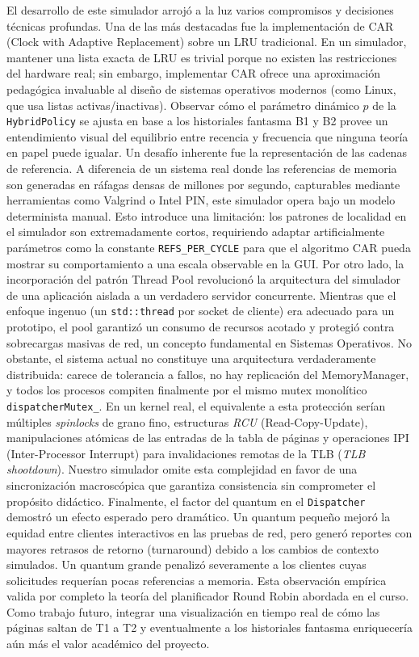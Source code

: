 \documentclass[12pt,letterpaper]{article}
\begin{document}
El desarrollo de este simulador arrojó a la luz varios compromisos y decisiones técnicas profundas.
Una de las más destacadas fue la implementación de CAR (Clock with Adaptive Replacement) sobre un LRU tradicional.
En un simulador, mantener una lista exacta de LRU es trivial porque no existen las restricciones del hardware real;
sin embargo, implementar CAR ofrece una aproximación pedagógica invaluable al diseño de sistemas operativos modernos (como Linux, que usa listas activas/inactivas).
Observar cómo el parámetro dinámico $p$ de la \texttt{HybridPolicy} se ajusta en base a los historiales fantasma B1 y B2 provee un entendimiento visual del equilibrio entre recencia y frecuencia que ninguna teoría en papel puede igualar.
Un desafío inherente fue la representación de las cadenas de referencia.
A diferencia de un sistema real donde las referencias de memoria son generadas en ráfagas densas de millones por segundo, capturables mediante herramientas como Valgrind o Intel PIN, este simulador opera bajo un modelo determinista manual.
Esto introduce una limitación: los patrones de localidad en el simulador son extremadamente cortos, requiriendo adaptar artificialmente parámetros como la constante \texttt{REFS\_PER\_CYCLE} para que el algoritmo CAR pueda mostrar su comportamiento a una escala observable en la GUI.
Por otro lado, la incorporación del patrón Thread Pool revolucionó la arquitectura del simulador de una aplicación aislada a un verdadero servidor concurrente.
Mientras que el enfoque ingenuo (un \texttt{std::thread} por socket de cliente) era adecuado para un prototipo, el pool garantizó un consumo de recursos acotado y protegió contra sobrecargas masivas de red, un concepto fundamental en Sistemas Operativos.
No obstante, el sistema actual no constituye una arquitectura verdaderamente distribuida: carece de tolerancia a fallos, no hay replicación del MemoryManager, y todos los procesos compiten finalmente por el mismo mutex monolítico \texttt{dispatcherMutex\_}.
En un kernel real, el equivalente a esta protección serían múltiples \textit{spinlocks} de grano fino, estructuras \textit{RCU} (Read-Copy-Update), manipulaciones atómicas de las entradas de la tabla de páginas y operaciones IPI (Inter-Processor Interrupt) para invalidaciones remotas de la TLB (\textit{TLB shootdown}).
Nuestro simulador omite esta complejidad en favor de una sincronización macroscópica que garantiza consistencia sin comprometer el propósito didáctico.
Finalmente, el factor del quantum en el \texttt{Dispatcher} demostró un efecto esperado pero dramático.
Un quantum pequeño mejoró la equidad entre clientes interactivos en las pruebas de red, pero generó reportes con mayores retrasos de retorno (turnaround) debido a los cambios de contexto simulados.
Un quantum grande penalizó severamente a los clientes cuyas solicitudes requerían pocas referencias a memoria.
Esta observación empírica valida por completo la teoría del planificador Round Robin abordada en el curso.
Como trabajo futuro, integrar una visualización en tiempo real de cómo las páginas saltan de T1 a T2 y eventualmente a los historiales fantasma enriquecería aún más el valor académico del proyecto.
\newpage
\end{document}
